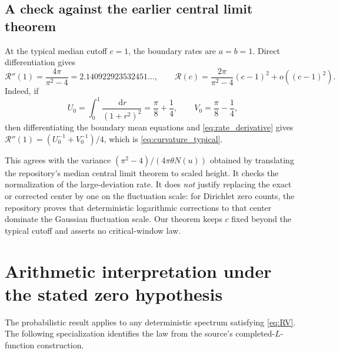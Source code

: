 \documentclass[11pt,letterpaper]{article}
\numberwithin{equation}{section}
\theoremstyle{definition}
\theoremstyle{remark}
\newcommand{\dd}{\,\mathrm d}
\newcommand{\mrate}{\mathcal R}
\begin{document}
\subsection{A check against the earlier central limit theorem}

At the typical median cutoff $c=1$, the boundary rates are $a=b=1$. Direct differentiation gives
\begin{equation}\label{eq:curvature_typical}
 \mrate''(1)=\frac{4\pi}{\pi^2-4}
 =2.140922923532451\ldots,
 \qquad
 \mrate(c)=\frac{2\pi}{\pi^2-4}(c-1)^2+o((c-1)^2).
\end{equation}
Indeed, if
\[
 U_0=\int_0^1\frac{\dd r}{(1+r^2)^2}=\frac\pi8+\frac14,
 \qquad V_0=\frac\pi8-\frac14,
\]
then differentiating the boundary mean equations and \cref{eq:rate_derivative} gives
$\mrate''(1)=(U_0^{-1}+V_0^{-1})/4$, which is \cref{eq:curvature_typical}.

This agrees with the variance $(\pi^2-4)/(4\pi\theta N(u))$ obtained by translating the repository's median central limit theorem to scaled height. It checks the normalization of the large-deviation rate. It does \emph{not} justify replacing the exact or corrected center by one on the fluctuation scale: for Dirichlet zero counts, the repository proves that deterministic logarithmic corrections to that center dominate the Gaussian fluctuation scale. Our theorem keeps $c$ fixed beyond the typical cutoff and asserts no critical-window law.

\section{Arithmetic interpretation under the stated zero hypothesis}\label{sec:arithmetic}

The probabilistic result applies to any deterministic spectrum satisfying \cref{eq:RV}. The following specialization identifies the law from the source's completed-$L$-function construction.
\end{document}
